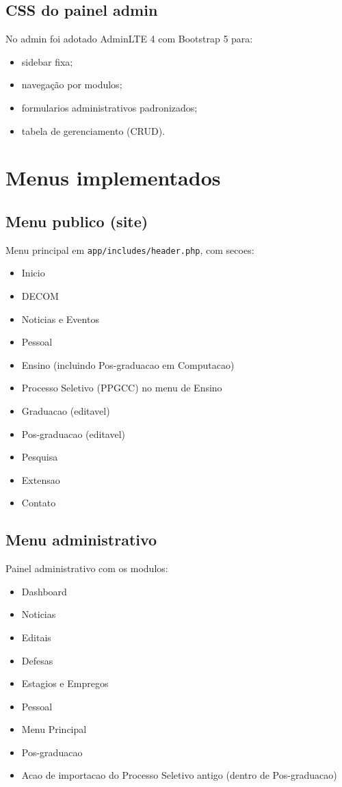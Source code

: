 \documentclass[12pt,a4paper]{article}
\begin{document}
\subsection{CSS do painel admin}
No admin foi adotado AdminLTE 4 com Bootstrap 5 para:
\begin{itemize}
    \item sidebar fixa;
    \item navegação por modulos;
    \item formularios administrativos padronizados;
    \item tabela de gerenciamento (CRUD).
\end{itemize}

\section{Menus implementados}
\subsection{Menu publico (site)}
Menu principal em \texttt{app/includes/header.php}, com secoes:
\begin{itemize}
    \item Inicio
    \item DECOM
    \item Noticias e Eventos
    \item Pessoal
    \item Ensino (incluindo Pos-graduacao em Computacao)
    \item Processo Seletivo (PPGCC) no menu de Ensino
    \item Graduacao (editavel)
    \item Pos-graduacao (editavel)
    \item Pesquisa
    \item Extensao
    \item Contato
\end{itemize}

\subsection{Menu administrativo}
Painel administrativo com os modulos:
\begin{itemize}
    \item Dashboard
    \item Noticias
    \item Editais
    \item Defesas
    \item Estagios e Empregos
    \item Pessoal
    \item Menu Principal
    \item Pos-graduacao
    \item Acao de importacao do Processo Seletivo antigo (dentro de Pos-graduacao)
\end{itemize}
\end{document}
